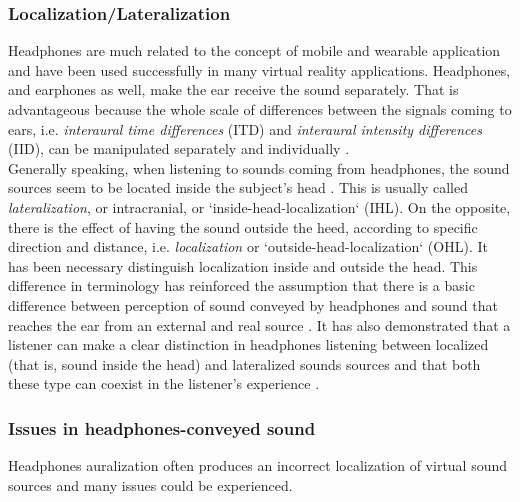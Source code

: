 \documentclass[journal]{IEEEtran}
\begin{document}
\subsubsection{Localization/Lateralization}
Headphones are much related to the concept of mobile and wearable application and have been used successfully in many virtual reality applications. Headphones, and earphones as well, make the ear receive the sound separately. That is advantageous because the whole scale of differences between the signals coming to ears, i.e. \emph{interaural time differences} (ITD) and \emph{interaural intensity differences} (IID), can be manipulated separately and individually \cite{}.\\
Generally speaking, when listening to sounds coming from headphones, the sound sources seem to be located inside the subject's head \cite{}. This is usually called \emph{lateralization}, or intracranial, or `inside-head-localization` (IHL). On the opposite, there is the effect of having the sound outside the heed, according to specific direction and distance, i.e. \emph{localization} or `outside-head-localization` (OHL).
It has been necessary distinguish localization inside and outside the head. This difference in terminology has reinforced the assumption that there is a basic difference between perception of sound conveyed by headphones and sound that reaches the ear from an external and real source \cite{}. It has also demonstrated that a listener can make a clear distinction in headphones listening between localized (that is, sound inside the head) and lateralized sounds sources and that both these type can coexist in the listener's experience \cite{}.  

\subsubsection{Issues in headphones-conveyed sound}
Headphones auralization often produces an incorrect localization of virtual sound sources \cite{} and many issues could be experienced.\\
\end{document}
